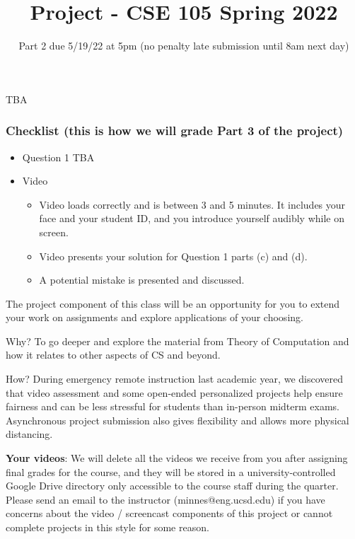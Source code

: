 TBA


\subsubsection*{Checklist (this is how we will grade Part 3 of the project)}
\begin{itemize}
    \item Question 1 TBA
\item Video
    \begin{itemize}
        \item Video loads correctly and is between 3 and 5 minutes. It includes your face and your student ID, 
        and you introduce yourself audibly while on screen.
        \item Video presents your solution for Question 1 parts (c) and (d).
        \item A potential mistake is presented and discussed.
    \end{itemize}
\end{itemize}
\newpage

\title{Project - CSE 105 Spring 2022}
\date{Part 2 due 5/19/22 at 5pm (no penalty late submission until 8am next day)}


\maketitle
\thispagestyle{fancy}

\vspace{-30pt}

 The project component of this class will be an opportunity for you to extend your work on 
 assignments and explore applications of your choosing. 
 
 Why?  To go deeper and explore the material from Theory of Computation and how it relates to 
 other aspects of CS and beyond. 
 
 How?  During emergency remote instruction last academic year, we discovered that video 
 assessment and some open-ended personalized projects help ensure fairness and can be less 
 stressful for students than in-person midterm exams. Asynchronous project submission also 
 gives flexibility and allows more physical distancing. 
 
 {\bf Your videos}: We will delete all the videos we receive from you after assigning final grades for 
 the course, and they will be stored in a university-controlled Google Drive directory only 
 accessible to the course staff during the quarter. Please send an email to the instructor 
 (minnes@eng.ucsd.edu) if you have concerns about the video / screencast components of this 
 project or cannot complete projects in this style for some reason. 
 
